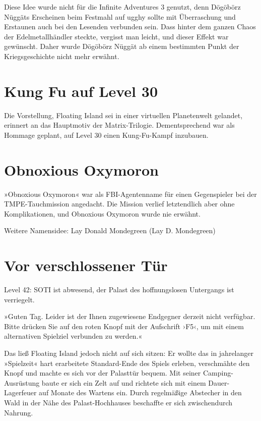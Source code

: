 Diese Idee wurde nicht für die Infinite Adventures 3 genutzt, denn Dögöbörz Nüggäts Erscheinen beim Festmahl auf ugghy sollte mit Überraschung und Erstaunen auch bei den Lesenden verbunden sein. Dass hinter dem ganzen Chaos der Edelmetallhändler steckte, vergisst man leicht, und dieser Effekt war gewünscht. Daher wurde Dögöbörz Nüggät ab einem bestimmten Punkt der Kriegsgeschichte nicht mehr erwähnt.


\section{Kung Fu auf Level 30}

Die Vorstellung, Floating Island sei in einer virtuellen Planetenwelt gelandet, erinnert an das Hauptmotiv der Matrix-Trilogie. Dementsprechend war als Hommage geplant, auf Level 30 einen Kung-Fu-Kampf inzubauen.


\section{Obnoxious Oxymoron}

»Obnoxious Oxymoron« war als FBI-Agentenname für einen Gegenspieler bei der TMPE-Tauchmission angedacht. Die Mission verlief letztendlich aber ohne Komplikationen, und Obnoxious Oxymoron wurde nie erwähnt.

Weitere Namensidee: Lay Donald Mondegreen (Lay D. Mondegreen)


\section{Vor verschlossener Tür}

Level 42: SOTI ist abwesend, der Palast des hoffnungslosen Untergangs ist verriegelt.

»Guten Tag. Leider ist der Ihnen zugewiesene Endgegner derzeit nicht verfügbar. Bitte drücken Sie auf den roten Knopf mit der Aufschrift ›F5‹, um mit einem alternativen Spielziel verbunden zu werden.«

Das ließ Floating Island jedoch nicht auf sich sitzen: Er wollte das in jahrelanger »Spielzeit« hart erarbeitete Standard-Ende des Spiels erleben, verschmähte den Knopf und machte es sich vor der Palasttür bequem. Mit seiner Camping-Ausrüstung baute er sich ein Zelt auf und richtete sich mit einem Dauer-Lagerfeuer auf Monate des Wartens ein. Durch regelmäßige Abstecher in den Wald in der Nähe des Palast-Hochhauses beschaffte er sich zwischendurch Nahrung.


